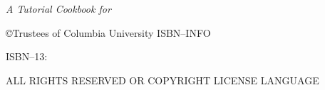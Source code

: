 \documentclass[10pt,twoside,openright]{memoir}
\begin{document}
\pagestyle{headings}
\let\cleardoublepage\clearpage
\maketitle
\frontmatter

\null\vfill

\begin{flushleft}
\textit{A Tutorial Cookbook for \TF}


\copyright{Trustees of Columbia University}
ISBN--INFO

ISBN--13: 
\bigskip





ALL RIGHTS RESERVED OR COPYRIGHT LICENSE LANGUAGE




\end{flushleft}
\let\cleardoublepage\clearpage

\newpage
\tableofcontents*
\mainmatter
\sloppy





\end{document}
